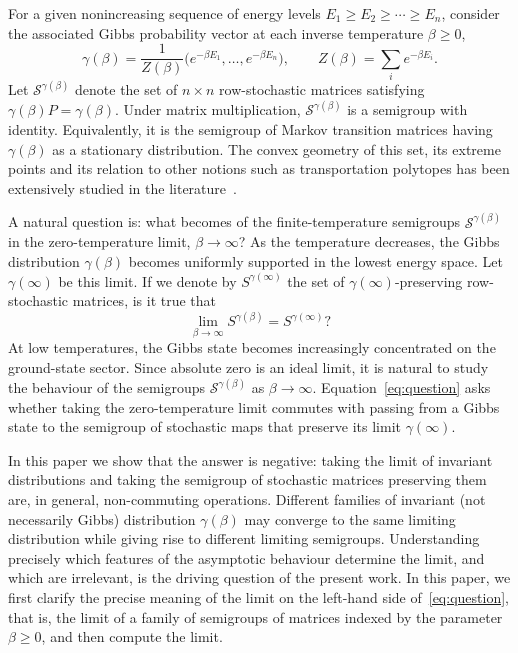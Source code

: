 \documentclass[11pt,a4paper,longbibliography]{amsart}
\numberwithin{equation}{section}
\theoremstyle{plain}
\theoremstyle{definition}
\theoremstyle{remark}
\begin{document}
	For a given nonincreasing sequence of energy levels $E_1\geq E_2\geq\cdots \geq E_n$, consider the associated Gibbs probability vector at each inverse temperature $\beta\geq0$,
	\begin{equation}
		\label{eq:Gibbs_intro}
		\gamma(\beta)
		=
		\frac1{Z(\beta)}
		\bigl(
		e^{-\beta E_1},
		\ldots,
		e^{-\beta E_n}
		\bigr),
		\qquad
		Z(\beta)=\sum_{i} e^{-\beta E_i}.
	\end{equation}
	Let $\mathcal S^{\gamma(\beta)}$ denote the set of $n\times n$ row-stochastic matrices satisfying
	$
	\gamma(\beta)P=\gamma(\beta)
	$.
	Under matrix multiplication, $\mathcal S^{\gamma(\beta)}$ is a semigroup with identity. Equivalently, it is the semigroup of Markov transition matrices having $\gamma(\beta)$ as a stationary distribution. The convex geometry of this set, its extreme points and its relation to other notions such as transportation polytopes has been extensively studied in the literature~\cite{Hartfiel1974, GregoryKirklandPullman1992, vom2019d,Cunden2025SemigroupMajorisation}.
	
	A natural question is: what becomes of the finite-temperature semigroups
	$\mathcal{S}^{\gamma(\beta)}$
	in the zero-temperature limit, $\beta\to\infty$? 
	As the temperature decreases, the Gibbs distribution $\gamma(\beta)$ becomes uniformly supported in the lowest energy space. Let $\gamma(\infty)$ be this limit. If we denote by $S^{\gamma(\infty)} $ the set of $\gamma(\infty)$-preserving row-stochastic matrices, is it true that
	\begin{equation}
		\label{eq:question}
		\lim_{\beta\to\infty}S^{\gamma(\beta)}=S^{\gamma(\infty)}?
	\end{equation}
	At low temperatures, the Gibbs state becomes increasingly concentrated on the ground-state sector. Since absolute zero is an ideal limit, it is natural to study the behaviour of the semigroups $\mathcal S^{\gamma(\beta)}$ as $\beta\to\infty$. Equation~\eqref{eq:question} asks whether taking the zero-temperature limit commutes with passing from a Gibbs state to the semigroup of stochastic maps that preserve its limit $\gamma(\infty)$.
	
	In this paper we show that the answer is negative: taking the limit of invariant distributions and taking the semigroup of stochastic matrices preserving them are, in general, non-commuting operations. Different families of invariant (not necessarily Gibbs) distribution $\gamma(\beta)$ may converge to the same limiting distribution while giving rise to different limiting semigroups. Understanding precisely which features of the asymptotic behaviour determine the limit, and which are irrelevant, is the driving question of the present work. In this paper, we first clarify the precise meaning of the limit on the left-hand side of~\eqref{eq:question}, that is, the limit of a family of semigroups of matrices indexed by the parameter $\beta\ge0$, and then compute the limit.
	
\end{document}
